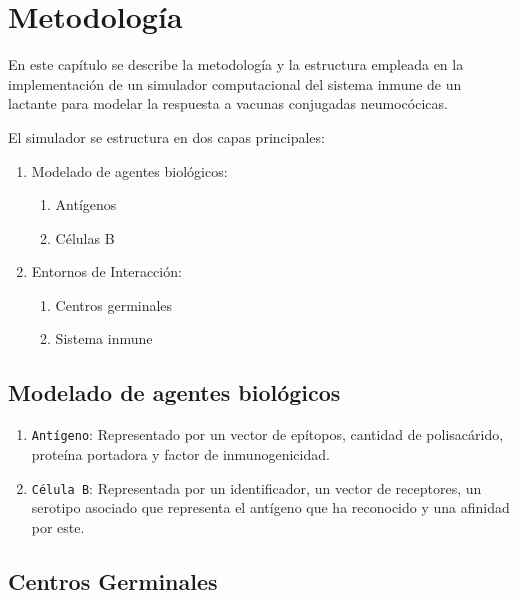 \chapter{Metodología}\label{chapter:metodologia}

En este capítulo se describe la metodología y la estructura empleada en la implementación de un simulador computacional del sistema inmune de un lactante para modelar la respuesta a vacunas conjugadas neumocócicas.

El simulador se estructura en dos capas principales:
\begin{enumerate}
    \item Modelado de agentes biológicos:
        \begin{enumerate}
            \item Antígenos
            \item Células B
        \end{enumerate}
    \item Entornos de Interacción:
        \begin{enumerate}
            \item Centros germinales
            \item Sistema inmune
        \end{enumerate}
\end{enumerate}
\section{Modelado de agentes biológicos}
\begin{enumerate}
    
    \item \texttt{Antígeno}: Representado por un vector de epítopos, cantidad de polisacárido, proteína portadora y factor de inmunogenicidad.
    \item \texttt{Célula B}: 
    Representada por un identificador, un vector de receptores, un serotipo asociado que representa el antígeno que ha reconocido y una afinidad por este.
\end{enumerate}

    


\section{Centros Germinales}

